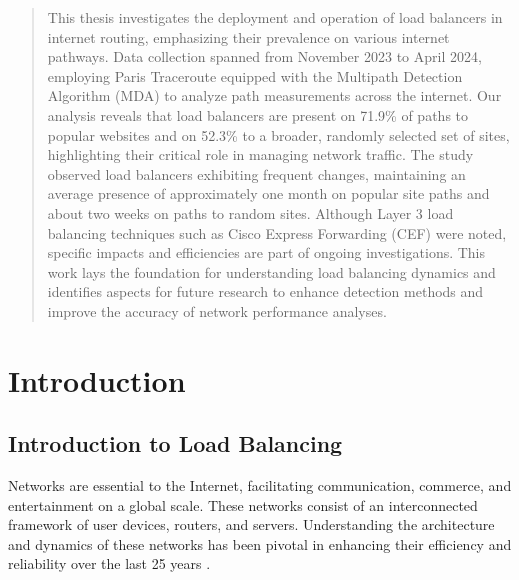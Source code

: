 \documentclass[12pt]{cwru_thesis}
\begin{document}
\printnomenclature

\begin{abstract}

This thesis investigates the deployment and operation of load balancers in internet routing, emphasizing their prevalence on various internet pathways. Data collection spanned from November 2023 to April 2024, employing Paris Traceroute equipped with the Multipath Detection Algorithm (MDA) to analyze path measurements across the internet. Our analysis reveals that load balancers are present on 71.9\% of paths to popular websites and on 52.3\% to a broader, randomly selected set of sites, highlighting their critical role in managing network traffic. The study observed load balancers exhibiting frequent changes, maintaining an average presence of approximately one month on popular site paths and about two weeks on paths to random sites. Although Layer 3 load balancing techniques such as Cisco Express Forwarding (CEF) were noted, specific impacts and efficiencies are part of ongoing investigations. This work lays the foundation for understanding load balancing dynamics and identifies aspects for future research to enhance detection methods and improve the accuracy of network performance analyses.

\end{abstract}



\mainmatter

\setcounter{secnumdepth}{2}

\chapter{Introduction} 
\label{chap:intro}

\section{Introduction to Load Balancing}

Networks are essential to the Internet, facilitating communication, commerce, and entertainment on a global scale. These networks consist of an interconnected framework of user devices, routers, and servers. Understanding the architecture and dynamics of these networks has been pivotal in enhancing their efficiency and reliability over the last 25 years \cite{paxson_endtoend96}.
\end{document}
